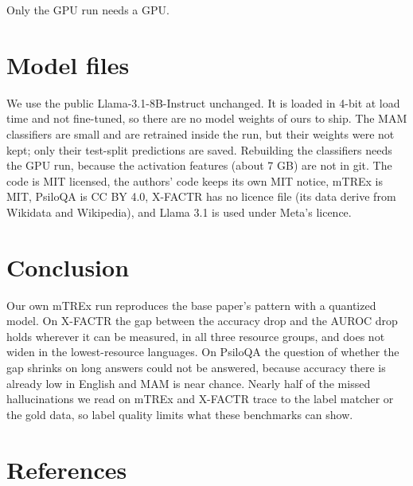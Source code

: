 \documentclass[12pt]{article}
\begin{document}
Only the GPU run needs a GPU.
\section{Model files}
We use the public Llama-3.1-8B-Instruct unchanged. It is loaded in 4-bit at load time and not fine-tuned, so there are no model weights of ours to ship. The MAM classifiers are small and are retrained inside the run, but their weights were not kept; only their test-split predictions are saved. Rebuilding the classifiers needs the GPU run, because the activation features (about 7 GB) are not in git. The code is MIT licensed, the authors' code keeps its own MIT notice, mTREx is MIT, PsiloQA is CC BY 4.0, X-FACTR has no licence file (its data derive from Wikidata and Wikipedia), and Llama 3.1 is used under Meta's licence.

\section{Conclusion}
Our own mTREx run reproduces the base paper's pattern with a quantized model. On X-FACTR the gap between the accuracy drop and the AUROC drop holds wherever it can be measured, in all three resource groups, and does not widen in the lowest-resource languages. On PsiloQA the question of whether the gap shrinks on long answers could not be answered, because accuracy there is already low in English and MAM is near chance. Nearly half of the missed hallucinations we read on mTREx and X-FACTR trace to the label matcher or the gold data, so label quality limits what these benchmarks can show.

\nocite{*}
{\titleformat{\section}{\headfont\fontsize{16.5bp}{21.45bp}\selectfont}{}{0pt}{}
\section{References}
{\fontsize{10.5bp}{15bp}\selectfont}}
\end{document}

